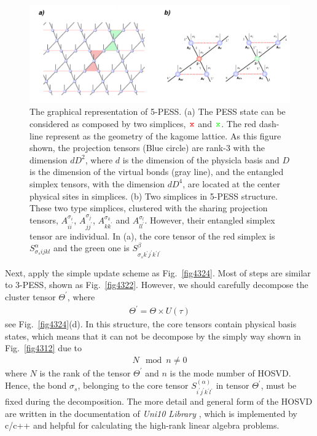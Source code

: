 \label{5pess}
\begin{figure}[ht]
	\centering
	\includegraphics[width=1.00\textwidth]{figures/fig4323.png}
	\caption[The graphical representation of 5-PESS]{The graphical representation of 5-PESS. (a) The PESS state can be considered as composed by two simplices, $\rjoinr$ and $\rjoing$. The red dash-line represent as the geometry of the kagome lattice. As this figure shown, the projection tensors (Blue circle) are rank-3 with the dimension $dD^2$, where $d$ is the dimension of the physicla basis and $D$ is the dimension of the virtual bonds (gray line), and the entangled simplex tensors, with the dimension $dD^4$, are located at the center physical sites in simplices. (b) Two simplices in 5-PESS structure. These two type simplices, clustered with the sharing projection tensors, $A^{\sigma_i}_{ii^{\prime}}$, $A^{\sigma_j}_{jj^{\prime}}$, $A^{\sigma_k}_{kk^{\prime}}$ and $A^{\sigma_l}_{ll^{\prime}}$. However, their entangled simplex tensor are individual. In (a), the core tensor of the red simplex is $S^{\alpha}_{\sigma_s ijkl}$ and the green one is $S^{\beta}_{\sigma_s k^{\prime}j^{\prime}k^{\prime}l^{\prime}}$}
	\label{fig4323}
\end{figure}
Next, apply the simple update scheme as Fig.~\ref{fig4324}. Most of steps are similar to 3-PESS, shown as Fig.~\ref{fig4322}. However, we should carefully decompose the cluster tensor $\Theta^{\prime}$, where
\begin{align}
	\Theta^{\prime} = \Theta \times U(\tau)
\end{align}
see Fig.~\ref{fig4324}(d). In this structure, the core tensors contain physical basis states, which means that it can not be decompose by the simply way shown in Fig.~\ref{fig4312} due to
\begin{align}
	N \mod n \neq 0
\end{align}
where $N$ is the rank of the tensor $\Theta^{\prime}$ and $n$ is the mode number of HOSVD. Hence, the bond $\sigma_s$, belonging to the core tensor $S^{(\alpha)}_{i^{\prime}j^{\prime}k^{\prime}l^{\prime}}$ in tensor $\Theta^{\prime}$, must be fixed during the decomposition. The more detail and general form of the HOSVD are written in the documentation of \textit{Uni10 Library} \cite{}, which is implemented by c/c++ and helpful for calculating the high-rank linear algebra problems.
